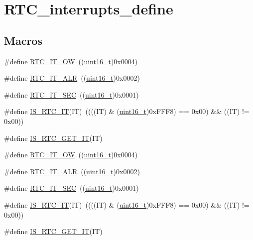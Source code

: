 \hypertarget{group___r_t_c__interrupts__define}{}\section{R\+T\+C\+\_\+interrupts\+\_\+define}
\label{group___r_t_c__interrupts__define}
\subsection*{Macros}
\begin{DoxyCompactItemize}
\item 
\#define \hyperlink{group___r_t_c__interrupts__define_gabcfefb2f22cb8ca65113c2c13d0e0640}{R\+T\+C\+\_\+\+I\+T\+\_\+\+OW}~((\hyperlink{_p_e___types_8h_a1f1825b69244eb3ad2c7165ddc99c956}{uint16\+\_\+t})0x0004)
\item 
\#define \hyperlink{group___r_t_c__interrupts__define_ga92f0316a3c69aefc2b20c3392843d3da}{R\+T\+C\+\_\+\+I\+T\+\_\+\+A\+LR}~((\hyperlink{_p_e___types_8h_a1f1825b69244eb3ad2c7165ddc99c956}{uint16\+\_\+t})0x0002)
\item 
\#define \hyperlink{group___r_t_c__interrupts__define_ga960bccbc10da872549cf52c03dd342f1}{R\+T\+C\+\_\+\+I\+T\+\_\+\+S\+EC}~((\hyperlink{_p_e___types_8h_a1f1825b69244eb3ad2c7165ddc99c956}{uint16\+\_\+t})0x0001)
\item 
\#define \hyperlink{group___r_t_c__interrupts__define_ga5c941995b804ce4c7ef62e28e0133a83}{I\+S\+\_\+\+R\+T\+C\+\_\+\+IT}(IT)~((((IT) \& (\hyperlink{_p_e___types_8h_a1f1825b69244eb3ad2c7165ddc99c956}{uint16\+\_\+t})0x\+F\+F\+F8) == 0x00) \&\& ((\+I\+T) != 0x00))
\item 
\#define \hyperlink{group___r_t_c__interrupts__define_ga2e10d8ccb2aa398ac14bde526f98dbc9}{I\+S\+\_\+\+R\+T\+C\+\_\+\+G\+E\+T\+\_\+\+IT}(IT)
\item 
\#define \hyperlink{group___r_t_c__interrupts__define_gabcfefb2f22cb8ca65113c2c13d0e0640}{R\+T\+C\+\_\+\+I\+T\+\_\+\+OW}~((\hyperlink{_p_e___types_8h_a1f1825b69244eb3ad2c7165ddc99c956}{uint16\+\_\+t})0x0004)
\item 
\#define \hyperlink{group___r_t_c__interrupts__define_ga92f0316a3c69aefc2b20c3392843d3da}{R\+T\+C\+\_\+\+I\+T\+\_\+\+A\+LR}~((\hyperlink{_p_e___types_8h_a1f1825b69244eb3ad2c7165ddc99c956}{uint16\+\_\+t})0x0002)
\item 
\#define \hyperlink{group___r_t_c__interrupts__define_ga960bccbc10da872549cf52c03dd342f1}{R\+T\+C\+\_\+\+I\+T\+\_\+\+S\+EC}~((\hyperlink{_p_e___types_8h_a1f1825b69244eb3ad2c7165ddc99c956}{uint16\+\_\+t})0x0001)
\item 
\#define \hyperlink{group___r_t_c__interrupts__define_ga5c941995b804ce4c7ef62e28e0133a83}{I\+S\+\_\+\+R\+T\+C\+\_\+\+IT}(IT)~((((IT) \& (\hyperlink{_p_e___types_8h_a1f1825b69244eb3ad2c7165ddc99c956}{uint16\+\_\+t})0x\+F\+F\+F8) == 0x00) \&\& ((\+I\+T) != 0x00))
\item 
\#define \hyperlink{group___r_t_c__interrupts__define_ga2e10d8ccb2aa398ac14bde526f98dbc9}{I\+S\+\_\+\+R\+T\+C\+\_\+\+G\+E\+T\+\_\+\+IT}(IT)
\end{DoxyCompactItemize}


